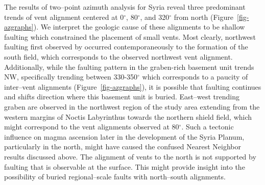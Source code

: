 \documentclass[preprint,review,authoryear,12pt]{elsarticle}
\begin{document}
The results of two--point azimuth analysis for Syria reveal three predominant trends of vent alignment centered at 0$^{\circ}$, 80$^{\circ}$, and 320$^{\circ}$ from north (Figure~\ref{fig-azgraphs}). We interpret the geologic cause of these alignments to be shallow faulting which constrained the placement of small vents. Most clearly, northwest faulting first observed by \citet{Baptista2008} occurred contemporaneously to the formation of the south field, which corresponds to the observed northwest vent alignment. Additionally, while the faulting pattern in the graben-rich basement unit trends NW, specifically trending between 330-350$^{\circ}$ which corresponds to a paucity of inter--vent alignments (Figure~\ref{fig-azgraphs}), it is possible that faulting continues and shifts direction where this basement unit is buried. East--west trending graben are observed in the northwest region of the study area extending from the western margins of Noctis Labyrinthus towards the northern shield field, which might correspond to the vent alignments observed at 80$^{\circ}$. Such a tectonic influence on magma ascension later in the development of the Syria Planum, particularly in the north, might have caused the confused Nearest Neighbor results discussed above. The alignment of vents to the north is not supported by faulting that is observable at the surface. This might provide insight into the possibility of buried regional--scale faults with north--south alignments.
\end{document}
